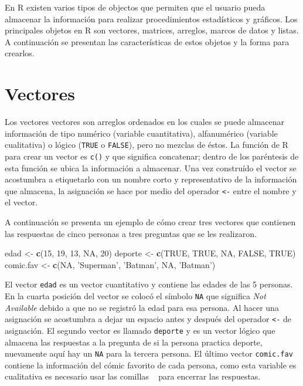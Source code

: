 \documentclass[10pt,]{krantz}
\makeatletter
\newenvironment{Shaded}{\begin{snugshade}}{\end{snugshade}}
\newcommand{\KeywordTok}[1]{\textcolor[rgb]{0.13,0.29,0.53}{\textbf{{#1}}}}
\newcommand{\DecValTok}[1]{\textcolor[rgb]{0.00,0.00,0.81}{{#1}}}
\newcommand{\StringTok}[1]{\textcolor[rgb]{0.31,0.60,0.02}{{#1}}}
\newcommand{\OtherTok}[1]{\textcolor[rgb]{0.56,0.35,0.01}{{#1}}}
\newcommand{\NormalTok}[1]{{#1}}
\let\proglang=\textsf
\newenvironment{kframe}{%
\medskip{}
\setlength{\fboxsep}{.8em}
 \def\at@end@of@kframe{}%
 \ifinner\ifhmode%
  \def\at@end@of@kframe{\end{minipage}}%
  \begin{minipage}{\columnwidth}%
 \fi\fi%
 \def\FrameCommand##1{\hskip\@totalleftmargin \hskip-\fboxsep
 \colorbox{shadecolor}{##1}\hskip-\fboxsep
     \hskip-\linewidth \hskip-\@totalleftmargin \hskip\columnwidth}%
 \MakeFramed {\advance\hsize-\width
   \@totalleftmargin\z@ \linewidth\hsize
   \@setminipage}}%
 {\par\unskip\endMakeFramed%
 \at@end@of@kframe}
\renewenvironment{Shaded}{\begin{kframe}}{\end{kframe}}
\makeatother
\begin{document}
En \proglang{R} existen varios tipos de objectos que permiten que el
usuario pueda almacenar la información para realizar procedimientos
estadísticos y gráficos. Los principales objetos en \proglang{R} son
vectores, matrices, arreglos, marcos de datos y listas. A continuación
se presentan las características de estos objetos y la forma para
crearlos.

\section{\texorpdfstring{Vectores 
\label{vector}}{Vectores  }}\label{vectores}

Los vectores vectores son arreglos ordenados en los cuales se puede
almacenar información de tipo numérico (variable cuantitativa),
alfanumérico (variable cualitativa) o lógico (\texttt{TRUE} o
\texttt{FALSE}), pero no mezclas de éstos. La función de \proglang{R}
para crear un vector es \texttt{c()} y que significa concatenar; dentro
de los paréntesis de esta función se ubica la información a almacenar.
Una vez construído el vector se acostumbra a etiquetarlo con un nombre
corto y representativo de la información que almacena, la asignación se
hace por medio del operador \texttt{\textless{}-} entre el nombre y el
vector.

A continuación se presenta un ejemplo de cómo crear tres vectores que
contienen las respuestas de cinco personas a tres preguntas que se les
realizaron.

\begin{Shaded}
\begin{Highlighting}[]
\NormalTok{edad <-}\StringTok{ }\KeywordTok{c}\NormalTok{(}\DecValTok{15}\NormalTok{, }\DecValTok{19}\NormalTok{, }\DecValTok{13}\NormalTok{, }\OtherTok{NA}\NormalTok{, }\DecValTok{20}\NormalTok{)}
\NormalTok{deporte <-}\StringTok{ }\KeywordTok{c}\NormalTok{(}\OtherTok{TRUE}\NormalTok{, }\OtherTok{TRUE}\NormalTok{, }\OtherTok{NA}\NormalTok{, }\OtherTok{FALSE}\NormalTok{, }\OtherTok{TRUE}\NormalTok{)}
\NormalTok{comic.fav <-}\StringTok{ }\KeywordTok{c}\NormalTok{(}\OtherTok{NA}\NormalTok{, }\StringTok{'Superman'}\NormalTok{, }\StringTok{'Batman'}\NormalTok{, }\OtherTok{NA}\NormalTok{, }\StringTok{'Batman'}\NormalTok{)}
\end{Highlighting}
\end{Shaded}

El vector \texttt{edad} es un vector cuantitativo y contiene las edades
de las 5 personas. En la cuarta posición del vector se colocó el símbolo
\texttt{NA} que significa \textit{Not Available} debido a que no se
registró la edad para esa persona. Al hacer una asignación se acostumbra
a dejar un espacio antes y después del operador \texttt{\textless{}-} de
asignación. El segundo vector es llamado \texttt{deporte} y es un vector
lógico que almacena las respuestas a la pregunta de si la persona
practica deporte, nuevamente aquí hay un \texttt{NA} para la tercera
persona. El último vector \texttt{comic.fav} contiene la información del
cómic favorito de cada persona, como esta variable es cualitativa es
necesario usar las comillas
\texttt{\textquotesingle{}\ \textquotesingle{}} para encerrar las
respuestas.
\end{document}
